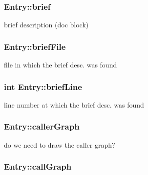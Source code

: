 \subsubsection[{brief}]{ Entry\+::brief}\label{class_entry_ad602ba19af5785515ed81790d843ce4c}


brief description (doc block) 

\hypertarget{class_entry_a9a0b7ed65e6082088ededf633771d3d1}{}
\subsubsection[{brief\+File}]{ Entry\+::brief\+File}\label{class_entry_a9a0b7ed65e6082088ededf633771d3d1}


file in which the brief desc. was found 

\hypertarget{class_entry_add7a19978ab2b30a9755b8d5e3cbd00a}{}
\subsubsection[{brief\+Line}]{\setlength{\rightskip}{0pt plus 5cm}int Entry\+::brief\+Line}\label{class_entry_add7a19978ab2b30a9755b8d5e3cbd00a}


line number at which the brief desc. was found 

\hypertarget{class_entry_a3693baa860ccc1625b5ac4fd3bc1761c}{}
\subsubsection[{caller\+Graph}]{ Entry\+::caller\+Graph}\label{class_entry_a3693baa860ccc1625b5ac4fd3bc1761c}


do we need to draw the caller graph? 

\hypertarget{class_entry_ac3b5637ee0f8469650e2d8d694733314}{}
\subsubsection[{call\+Graph}]{ Entry\+::call\+Graph}\label{class_entry_ac3b5637ee0f8469650e2d8d694733314}


